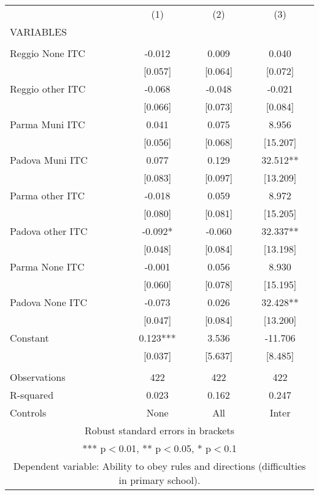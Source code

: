 \begin{tabular}{lccc} \hline
 & (1) & (2) & (3) \\
VARIABLES &  &  &  \\ \hline
 &  &  &  \\
Reggio None ITC & -0.012 & 0.009 & 0.040 \\
 & [0.057] & [0.064] & [0.072] \\
Reggio other ITC & -0.068 & -0.048 & -0.021 \\
 & [0.066] & [0.073] & [0.084] \\
Parma Muni ITC & 0.041 & 0.075 & 8.956 \\
 & [0.056] & [0.068] & [15.207] \\
Padova Muni ITC & 0.077 & 0.129 & 32.512** \\
 & [0.083] & [0.097] & [13.209] \\
Parma other ITC & -0.018 & 0.059 & 8.972 \\
 & [0.080] & [0.081] & [15.205] \\
Padova other ITC & -0.092* & -0.060 & 32.337** \\
 & [0.048] & [0.084] & [13.198] \\
Parma None ITC & -0.001 & 0.056 & 8.930 \\
 & [0.060] & [0.078] & [15.195] \\
Padova None ITC & -0.073 & 0.026 & 32.428** \\
 & [0.047] & [0.084] & [13.200] \\
Constant & 0.123*** & 3.536 & -11.706 \\
 & [0.037] & [5.637] & [8.485] \\
 &  &  &  \\
Observations & 422 & 422 & 422 \\
R-squared & 0.023 & 0.162 & 0.247 \\
 Controls & None & All & Inter \\ \hline
\multicolumn{4}{c}{ Robust standard errors in brackets} \\
\multicolumn{4}{c}{ *** p$<$0.01, ** p$<$0.05, * p$<$0.1} \\
\multicolumn{4}{c}{ Dependent variable: Ability to obey rules and directions (difficulties in primary school).} \\
\end{tabular}
